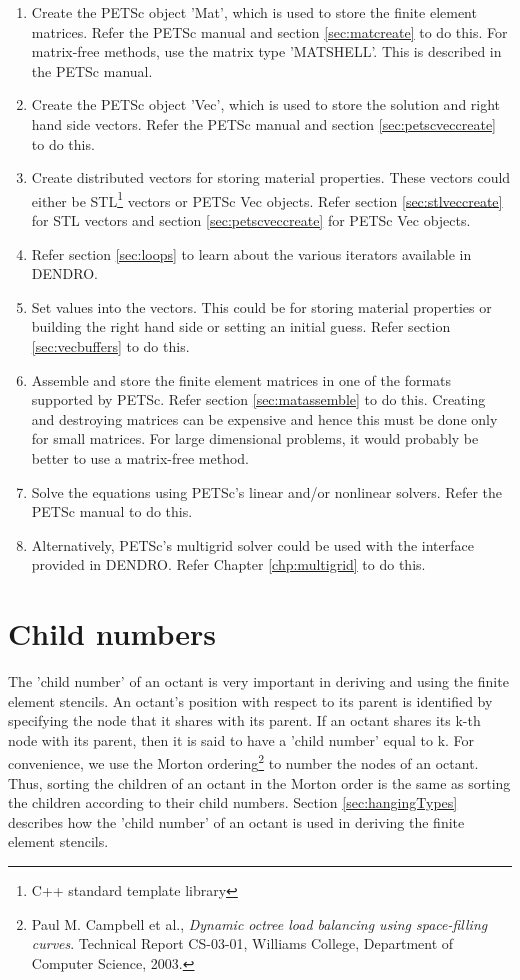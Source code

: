 \documentclass[12pt,reqno,a4paper]{report}
\numberwithin{equation}{section}
\begin{document}
\begin{enumerate}
\item Create the PETSc object 'Mat', which is used to store the finite element matrices. Refer the PETSc manual and section \ref{sec:matcreate} to do this. For matrix-free methods, use the matrix type 'MATSHELL'. This is described in the PETSc manual.

\item Create the PETSc object 'Vec', which is used to store the solution and right hand side vectors. Refer the PETSc manual and section \ref{sec:petscveccreate} to do this.

\item Create distributed vectors for storing material properties. These vectors could either be STL\footnote{C++ standard template library} vectors or PETSc Vec objects. Refer section \ref{sec:stlveccreate} for STL vectors and section \ref{sec:petscveccreate} for PETSc Vec objects.

\item Refer section \ref{sec:loops} to learn about the various iterators available in DENDRO.

\item Set values into the vectors. This could be for storing material properties or building the right hand side or setting an initial guess. Refer section \ref{sec:vecbuffers} to do this.

\item Assemble and store the finite element matrices in one of the formats supported by PETSc. Refer section \ref{sec:matassemble} to do this. Creating and destroying matrices can be expensive and hence this must be done only for small matrices. For large dimensional problems, it would probably be better to use a matrix-free method.

\item Solve the equations using PETSc's linear and/or nonlinear solvers. Refer the PETSc manual to do this.

\item Alternatively, PETSc's multigrid solver could be used with the interface provided in DENDRO. Refer Chapter \ref{chp:multigrid} to do this.
\end{enumerate}

\section{Child numbers}
\label{sec:childNumber}
The 'child number' of an octant is very important in deriving and using the finite element stencils. An octant's position with respect to its parent is identified by specifying the node that it shares with its parent. If an octant shares its k-th node with its parent, then it is said to have a 'child number' equal to k. For convenience, we use the Morton ordering\footnote{Paul M. Campbell et al., \textit{Dynamic octree load balancing using space-filling curves}. Technical Report CS-03-01, Williams College, Department of Computer Science, 2003.} to number the nodes of an octant. Thus, sorting the children of an octant in the Morton order is the same as sorting the children according to their child numbers. Section \ref{sec:hangingTypes} describes how the 'child number' of an octant is used in deriving the finite element stencils.
\end{document}
